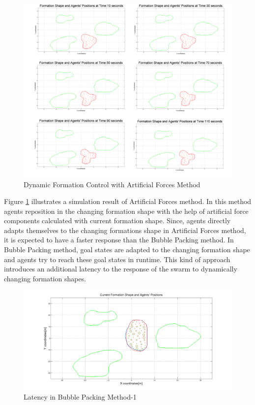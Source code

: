 \begin{figure}[H]
\caption{Dynamic Formation Control with Artificial Forces Method} \label{multiple2_ref}
\centerline{\includegraphics[scale = 0.16]{multiple2}}
\end{figure} 		 

Figure \ref{multiple2_ref} illustrates a simulation result of Artificial Forces method. In this method agents reposition in the changing formation shape with the help of artificial force components calculated with current formation shape. Since, agents directly adapts themselves to the changing formations shape in Artificial Forces method, it is expected to have a faster response than the Bubble Packing method. In Bubble Packing method, goal states are adapted to the changing formation shape and agents try to reach these goal states in runtime. This kind of approach introduces an additional latency to the response of the swarm to dynamically changing formation shapes. 

\begin{figure}[H]
\caption{Latency in Bubble Packing Method-1} \label{combo1_ref}
\centerline{\includegraphics[scale = 0.30]{combo1}}
\end{figure} 

